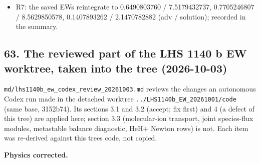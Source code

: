 \documentclass[english,a4paper]{my_memo}
\begin{document}
\begin{itemize}
  product; they now assert 2 ulps (\texttt{...\_to\_2ulp}, 4.5e-16) with a
  DIAGNOSTIC line of the bitwise-unequal counts: 14/14 with the suite\textquotesingle s
  -O0 flags, with gfortran -O3 (0 unequal) and with ifx -O3 -xHost (552
  and 405 unequal of 1506, max 2.2e-16). A second copy of the function
  would still be caught (its difference is the closed form\textquotesingle s 1e-9 to
  1e-14 error below d = 1e-2).
\item
  R7: the saved EWs reintegrate to 0.6490803760 / 7.5179432737,
  0.7705246807 / 8.5629850578, 0.1407893262 / 2.1470782882 (adv /
  solution); recorded in the summary.
\end{itemize}

\subsection{63. The reviewed part of the LHS 1140 b EW worktree, taken into the tree (2026-10-03)}\label{63-the-reviewed-part-of-the-lhs-1140-b-ew-worktree-taken-into-the-tree-2026-10-03}

\texttt{md/lhs1140b\_ew\_codex\_review\_20261003.md} reviews the changes an autonomous
Codex run made in the detached worktree \texttt{../LHS1140b\_EW\_20261001/code}
(same base, 3152b74). Its sections 3.1 and 3.2 (accept; fix first) and 4
(a defect of this tree) are applied here; section 3.3 (molecular-ion
transport, joint species-flux modules, metastable balance diagnostic,
HeH+ Newton rows) is not. Each item was re-derived against this tree\textquotesingle s
code, not copied.

\textbf{Physics corrected.}
\end{document}
